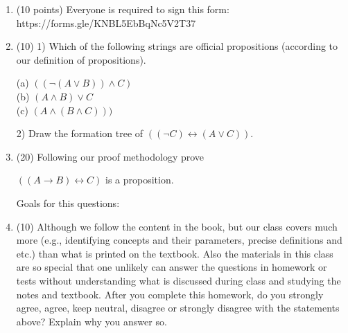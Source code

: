 \documentclass[12pt, letterpaper]{article}
\begin{document}
\begin{enumerate}

\item (10 points) Everyone is required to sign this form: \\
 https://forms.gle/KNBL5EbBqNc5V2T37 

\item (10)  1) Which of the following strings are official
propositions (according to our definition of propositions).

(a) $((\neg (A \vee B)) \wedge C)$\\
(b) $(A \wedge B) \vee C$ \\
(c) $(A \wedge (B \wedge C)))$ 

2) Draw the formation tree of $((\neg C) \leftrightarrow (A \vee C))$.

\item (20) Following our proof methodology prove
\begin{center}
  $((A \rightarrow B) \leftrightarrow C)$ is a proposition.
\end{center}
Goals for this questions:

\item (10) Although we follow the content in the book, but our class covers much more (e.g., identifying concepts and their parameters, precise definitions and etc.) than what is printed on the textbook. Also the materials in this class are so special that one unlikely can answer the questions in homework or tests without understanding what is discussed during class  and studying the notes and textbook. After you complete this homework, do you strongly agree, agree, keep neutral, disagree or strongly disagree with the statements above? Explain why you answer so. 


\end{enumerate}
\end{document}
